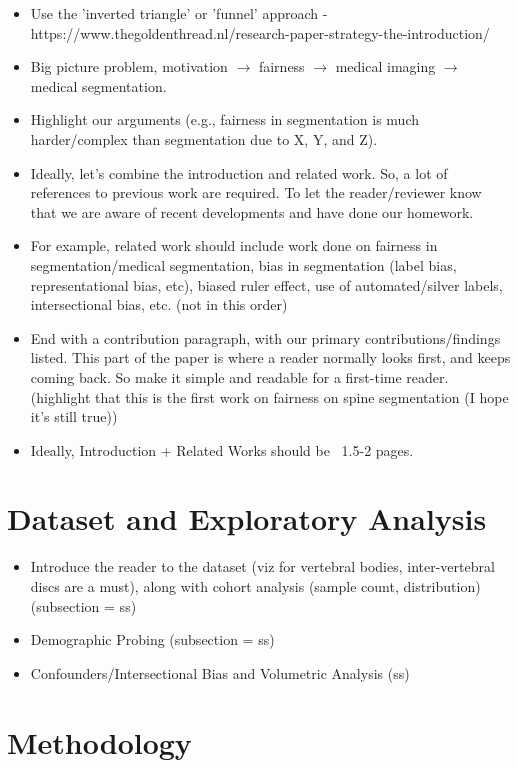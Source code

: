 \documentclass[runningheads]{llncs}
\begin{document}
\begin{itemize}
    \item Use the 'inverted triangle' or 'funnel' approach - https://www.thegoldenthread.nl/research-paper-strategy-the-introduction/
    \item Big picture problem, motivation $\rightarrow$ fairness $\rightarrow$ medical imaging $\rightarrow$ medical segmentation.
    \item Highlight our arguments (e.g., fairness in segmentation is much harder/complex than segmentation due to X, Y, and Z).
    \item Ideally, let's combine the introduction and related work. So, a lot of references to previous work are required. To let the reader/reviewer know that we are aware of recent developments and have done our homework.
    \item For example, related work should include work done on fairness in segmentation/medical segmentation, bias in segmentation (label bias, representational bias, etc), biased ruler effect, use of automated/silver labels, intersectional bias, etc. (not in this order)
    \item End with a contribution paragraph, with our primary contributions/findings listed. This part of the paper is where a reader normally looks first, and keeps coming back. So make it simple and readable for a first-time reader. (highlight that this is the first work on fairness on spine segmentation (I hope it's still true))
    \item Ideally, Introduction + Related Works should be ~1.5-2 pages.
\end{itemize}

\section{Dataset and Exploratory Analysis}

\begin{itemize}
    \item Introduce the reader to the dataset (viz for vertebral bodies, inter-vertebral discs are a must), along with cohort analysis (sample count, distribution) (subsection = ss)
    \item Demographic Probing (subsection = ss)
    \item Confounders/Intersectional Bias and Volumetric Analysis (ss)
\end{itemize}

\section{Methodology}
\end{document}

